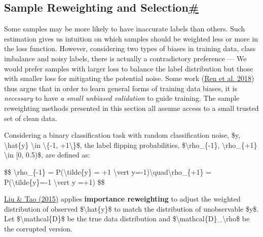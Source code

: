 \subsection{\texorpdfstring{Sample Reweighting and Selection\hyperref[sample-reweighting-and-selection]{\#}}{Sample Reweighting and Selection\#}}\label{sample-reweighting-and-selection}

Some samples may be more likely to have inaccurate labels than others. Such estimation gives us intuition on which samples should be weighted less or more in the loss function. However, considering two types of biases in training data, class imbalance and noisy labels, there is actually a contradictory preference --- We would prefer samples with larger loss to balance the label distribution but those with smaller loss for mitigating the potential noise. Some work (\href{https://arxiv.org/abs/1803.09050}{Ren et al. 2018}) thus argue that in order to learn general forms of training data biases, it is \emph{necessary} to have \emph{a small unbiased validation} to guide training. The sample reweighting methods presented in this section all assume access to a small trusted set of clean data.

Considering a binary classification task with random classification noise, \$y, \textbackslash hat\{y\} \textbackslash in \textbackslash\{-1, +1\textbackslash\}\$, the label flipping probabilities, \$\textbackslash rho\_\{-1\}, \textbackslash rho\_\{+1\} \textbackslash in {[}0, 0.5)\$, are defined as:

\$\$ \textbackslash rho\_\{-1\} = P(\textbackslash tilde\{y\} = +1 \textbackslash vert y=-1)\textbackslash quad\textbackslash rho\_\{+1\} = P(\textbackslash tilde\{y\}=-1 \textbackslash vert y =+1) \$\$

\href{https://arxiv.org/abs/1411.7718}{Liu \& Tao (2015)} applies \textbf{importance reweighting} to adjust the weighted distribution of observed \$\textbackslash hat\{y\}\$ to match the distribution of unobservable \$y\$. Let \$\textbackslash mathcal\{D\}\$ be the true data distribution and \$\textbackslash mathcal\{D\}\_\textbackslash rho\$ be the corrupted version.


